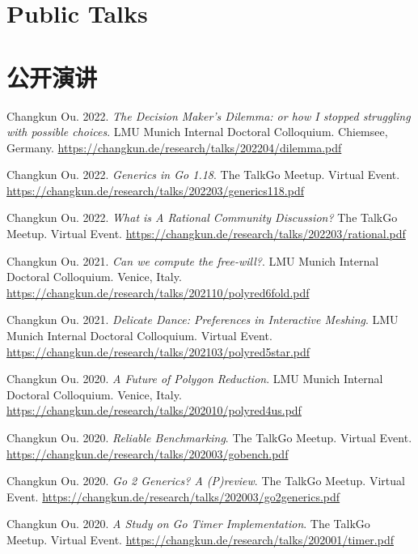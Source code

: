  {
  \section{\textbf{Public Talks}}
}{
  \section{\textbf{公开演讲}}
}
\resumeSubHeadingListStart
\small
    \item{
      Changkun Ou. 2022.
      \emph{The Decision Maker's Dilemma: or how I stopped struggling with possible choices}.
      LMU Munich Internal Doctoral Colloquium. Chiemsee, Germany.
      \url{https://changkun.de/research/talks/202204/dilemma.pdf}
    }
    \item{
      Changkun Ou. 2022.
      \emph{Generics in Go 1.18}.
      The TalkGo Meetup. Virtual Event.
      \url{https://changkun.de/research/talks/202203/generics118.pdf}
    }
    \item{
      Changkun Ou. 2022.
      \emph{What is A Rational Community Discussion?}
      The TalkGo Meetup. Virtual Event.
      \url{https://changkun.de/research/talks/202203/rational.pdf}
    }
    \item{
      Changkun Ou. 2021.
      \emph{Can we compute the free-will?}.
      LMU Munich Internal Doctoral Colloquium. Venice, Italy.
      \url{https://changkun.de/research/talks/202110/polyred6fold.pdf}
    }
    \item{
      Changkun Ou. 2021.
      \emph{Delicate Dance: Preferences in Interactive Meshing}.
      LMU Munich Internal Doctoral Colloquium. Virtual Event.
      \url{https://changkun.de/research/talks/202103/polyred5star.pdf}
    }
    \item{
      Changkun Ou. 2020.
      \emph{A Future of Polygon Reduction}.
      LMU Munich Internal Doctoral Colloquium. Venice, Italy.
      \url{https://changkun.de/research/talks/202010/polyred4us.pdf}
    }
    \item{
      Changkun Ou. 2020.
      \emph{Reliable Benchmarking}.
      The TalkGo Meetup. Virtual Event.
      \url{https://changkun.de/research/talks/202003/gobench.pdf}
    }
    \item{
      Changkun Ou. 2020.
      \emph{Go 2 Generics? A (P)review}.
      The TalkGo Meetup. Virtual Event.
      \url{https://changkun.de/research/talks/202003/go2generics.pdf}
    }
    \item{
      Changkun Ou. 2020.
      \emph{A Study on Go Timer Implementation}.
      The TalkGo Meetup. Virtual Event.
      \url{https://changkun.de/research/talks/202001/timer.pdf}
    }
